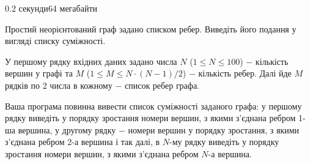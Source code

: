 \begin{problem}{}{}{}{0.2 секунди}{64 мегабайти}

Простий неорієнтований граф задано списком ребер. Виведіть його подання у вигляді списку суміжності.

\InputFile
У першому рядку вхідних даних задано числа $N$ ($1 \le N \le 100$) $-$ кількість вершин у графі та 
$M$ ($1 \le M \le N\cdot(N-1)/2$) $-$ кількість ребер.
Далі йде $M$ рядків по $2$ числа в кожному $-$ список ребер графа. 

\OutputFile
Ваша програма повинна вивести список суміжності заданого графа: у першому рядку виведіть у порядку зростання
номери вершин, з якими з'єднана ребром 1-ша вершина, у другому рядку $-$ номери вершин у порядку зростання,
з якими з'єднана ребром 2-а вершина і так далі, в $N$-му рядку виведіть у порядку зростання
номери вершин, з якими з'єднана ребром $N$-а вершина.


\Example

\begin{example}
\end{example}

\end{problem}

